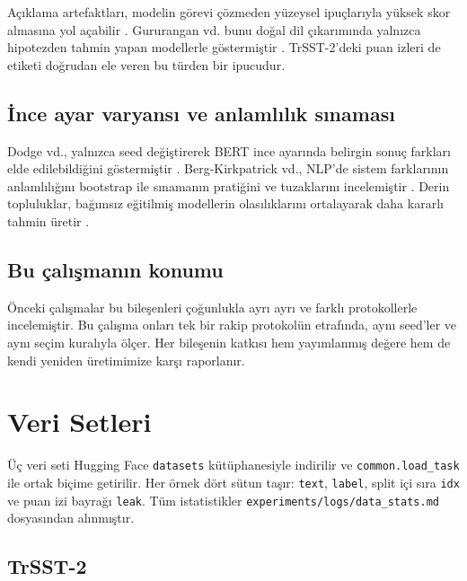 \documentclass[11pt]{article}
\begin{document}
Açıklama artefaktları, modelin görevi çözmeden yüzeysel ipuçlarıyla yüksek skor almasına yol açabilir \citep{gururangan2018}. Gururangan vd. bunu doğal dil çıkarımında yalnızca hipotezden tahmin yapan modellerle göstermiştir \citep{gururangan2018}. TrSST-2'deki puan izleri de etiketi doğrudan ele veren bu türden bir ipucudur.

\subsection{İnce ayar varyansı ve anlamlılık sınaması}

Dodge vd., yalnızca seed değiştirerek BERT ince ayarında belirgin sonuç farkları elde edilebildiğini göstermiştir \citep{dodge2020}. Berg-Kirkpatrick vd., NLP'de sistem farklarının anlamlılığını bootstrap ile sınamanın pratiğini ve tuzaklarını incelemiştir \citep{bergkirkpatrick2012}. Derin topluluklar, bağımsız eğitilmiş modellerin olasılıklarını ortalayarak daha kararlı tahmin üretir \citep{lakshminarayanan2017}.

\subsection{Bu çalışmanın konumu}

Önceki çalışmalar bu bileşenleri çoğunlukla ayrı ayrı ve farklı protokollerle incelemiştir. Bu çalışma onları tek bir rakip protokolün etrafında, aynı seed'ler ve aynı seçim kuralıyla ölçer. Her bileşenin katkısı hem yayımlanmış değere hem de kendi yeniden üretimimize karşı raporlanır.

\section{Veri Setleri}\label{sec:3}

Üç veri seti Hugging Face \texttt{datasets} kütüphanesiyle indirilir ve \texttt{common.\allowbreak{}\allowbreak{}load\_\allowbreak{}\allowbreak{}task} ile ortak biçime getirilir. Her örnek dört sütun taşır: \texttt{text}, \texttt{label}, split içi sıra \texttt{idx} ve puan izi bayrağı \texttt{leak}. Tüm istatistikler \texttt{experiments/\allowbreak{}\allowbreak{}logs/\allowbreak{}\allowbreak{}data\_\allowbreak{}\allowbreak{}stats.\allowbreak{}\allowbreak{}md} dosyasından alınmıştır.

\subsection{TrSST-2}
\end{document}
